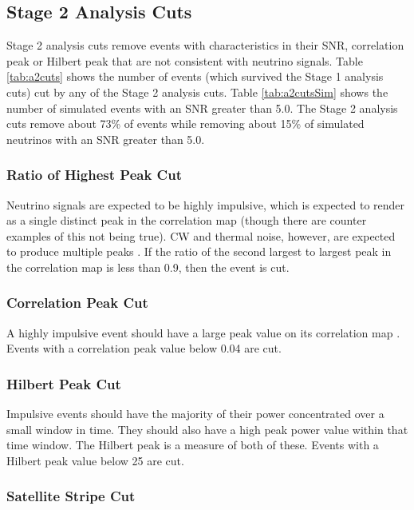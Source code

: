 \subsection{Stage 2 Analysis Cuts}

Stage 2 analysis cuts remove events with characteristics in their SNR, correlation peak or Hilbert peak that are not consistent with neutrino signals.  Table \ref{tab:a2cuts} shows the number of events (which survived the Stage 1 analysis cuts) cut by any of the Stage 2 analysis cuts.  Table \ref{tab:a2cutsSim} shows the number of simulated events with an SNR greater than 5.0.  The Stage 2 analysis cuts remove about 73\% of events while removing about 15\% of simulated neutrinos with an SNR greater than 5.0.  

\subsubsection{Ratio of Highest Peak Cut}

Neutrino signals are expected to be highly impulsive, which is expected to render as a single distinct peak in the correlation map (though there are counter examples of this not being true).  CW and thermal noise, however, are expected to produce multiple peaks \cite{sam}.  If the ratio of the second largest to largest peak in the correlation map is less than 0.9, then the event is cut. 

\subsubsection{Correlation Peak Cut}

A highly impulsive event should have a large peak value on its correlation map \cite{sam}.  Events with a correlation peak value below 0.04 are cut.  

\subsubsection{Hilbert Peak Cut}

Impulsive events should have the majority of their power concentrated over a small window in time.   They should also have a high peak power value within that time window.  The Hilbert peak is a measure of both of these.  Events with a Hilbert peak value below 25 are cut. 

\subsubsection{Satellite Stripe Cut}

